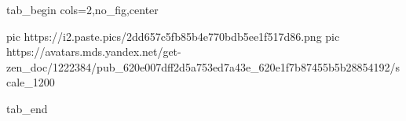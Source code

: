  
 
 
 
 


\ifcmt
  tab_begin cols=2,no_fig,center

     pic https://i2.paste.pics/2dd657c5fb85b4e770bdb5ee1f517d86.png
		 pic https://avatars.mds.yandex.net/get-zen_doc/1222384/pub_620e007dff2d5a753ed7a43e_620e1f7b87455b5b28854192/scale_1200

  tab_end
\fi
